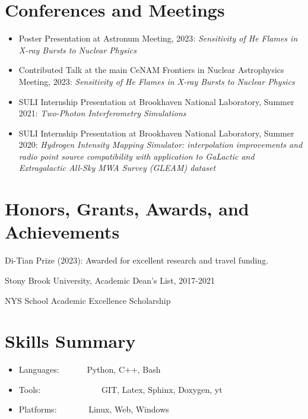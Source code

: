 \documentclass[a4paper,20pt]{article}
\newcommand{\resumeItem}[2]{
  \item\small{
    \textrm{#1}{: #2 \vspace{-2pt}}
  }
}
\newcommand{\resumeSubItem}[2]{\resumeItem{#1}{#2}\vspace{-3pt}}
\newcommand{\resumeSubHeadingListStart}{\begin{itemize}[leftmargin=*]}
\newcommand{\resumeSubHeadingListEnd}{\end{itemize}}
\begin{document}
\section{Conferences and Meetings}
\resumeSubHeadingListStart
\resumeSubItem{Poster Presentation at Astronum Meeting, 2023}{\it Sensitivity of He Flames in X-ray Bursts to Nuclear Physics}
\resumeSubItem{Contributed Talk at the main CeNAM Frontiers in Nuclear Astrophysics Meeting, 2023}{{\it Sensitivity of He Flames in X-ray Bursts to Nuclear Physics}}
\resumeSubItem{SULI Internship Presentation at Brookhaven National Laboratory, Summer 2021}{\it Two-Photon Interferometry Simulations}
\resumeSubItem{SULI Internship Presentation at Brookhaven National Laboratory, Summer 2020}{\it Hydrogen Intensity Mapping Simulator: interpolation improvements and radio point source compatibility with application to GaLactic and Extragalactic All-Sky MWA Survey (GLEAM) dataset}

\resumeSubHeadingListEnd

\section{Honors, Grants, Awards, and Achievements}
\begin{description}[font=$\bullet$]
\item {Di-Tian Prize (2023): Awarded for excellent research and travel funding.}
\item {Stony Brook University, Academic Dean's List, 2017-2021}
\item {NYS School Academic Excellence Scholarship}
\vspace{-5pt}
\end{description}

\vspace{-5pt}

\section{Skills Summary}
\resumeSubHeadingListStart
	\resumeSubItem{Languages}{~~~~~~Python, C++, Bash}
	\resumeSubItem{Tools}{~~~~~~~~~~~~~~GIT, Latex, Sphinx, Doxygen, yt}
	\resumeSubItem{Platforms}{~~~~~~~Linux, Web, Windows}

\resumeSubHeadingListEnd

\vspace{-5pt}
\end{document}
